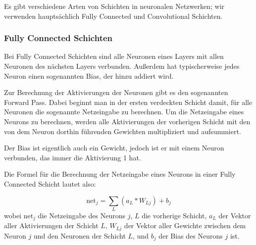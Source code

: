 \documentclass[10pt]{article}
\newcommand{\form}[1]{#1} %
\newcommand{\feng}[1]{{#1}}
\newcommand{\netin}{\textrm{net}}
\newcommand{\threesub}[1]{
        \vspace{1.5ex}
        \noindent {\textbf{#1}}
        \vspace{0.5ex}
    }
\begin{document}
Es gibt verschiedene Arten von Schichten in neuronalen Netzwerken; wir verwenden hauptsächlich \feng{Fully Connected} und \feng{Convolutional} Schichten.

\subsubsection{Fully Connected Schichten} 

Bei Fully Connected Schichten sind alle Neuronen eines Layers mit allen Neuronen des nächsten Layers verbunden.
Außerdem hat typischerweise jedes Neuron einen sogenannten Bias, der hinzu addiert wird.


Zur Berechnung der Aktivierungen der Neuronen gibt es den sogenannten \feng{Forward Pass}. 
Dabei beginnt man in der ersten verdeckten Schicht damit, für alle Neuronen die sogenannte Netzeingabe zu berechnen. 
Um die Netzeingabe eines Neurons zu berechnen, werden alle Aktivierungen der vorherigen Schicht mit den von dem Neuron dorthin führenden Gewichten multipliziert und aufsummiert.

Der Bias ist eigentlich auch ein Gewicht, jedoch ist er mit einem Neuron verbunden, das immer die Aktivierung 1 hat. \cite{brotcrunsher:forwardpass}

Die Formel für die Berechnung der Netzeingabe eines Neurons in einer Fully Connected Schicht lautet also:

\form{\[
	\netin_j = \sum_{L} (a_{L} * W_{Lj}) + b_{j}
	\]}
\noindent wobei $\netin_j$ die Netzeingabe des Neurons $j$, $L$ die vorherige Schicht, $a_L$ der Vektor aller Aktivierungen der Schicht $L$, $W_{Lj}$ der Vektor aller Gewichte zwischen dem Neuron $j$ und den Neuronen der Schicht $L$, und $b_j$ der Bias des Neurons $j$ ist. 
\end{document}
